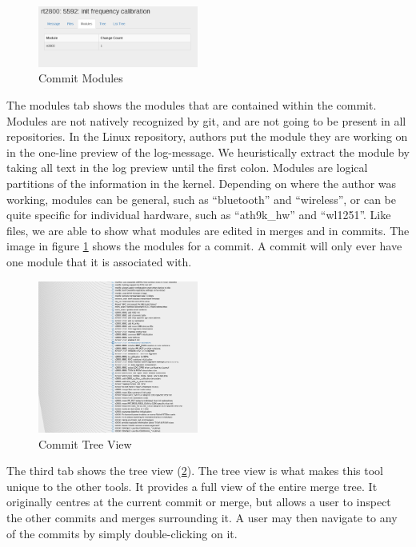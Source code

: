 \documentclass[conference, draftclsnofoot]{IEEEtran}
\begin{document}
\begin{figure}[h]
	\centering
	\includegraphics[width=0.47\textwidth]{figures/modules.png}
	\caption{Commit Modules}
	\label{fig:modules}
\end{figure}

The modules tab shows the modules that are contained within the commit. Modules
are not natively recognized by git, and are not going to be present in all
repositories. In the Linux repository, authors put the module they are working
on in the one-line preview of the log-message. We heuristically extract the
module by taking all text in the log preview until the first colon. Modules are
logical partitions of the information in the kernel. Depending on where the
author was working, modules can be general, such as ``bluetooth'' and
``wireless'', or can be quite specific for individual hardware, such as
``ath9k\_hw'' and ``wl1251''. Like files, we are able to show what modules are
edited in merges and in commits. The image in figure \ref{fig:modules} shows
the modules for a commit. A commit will only ever have one module that it is
associated with.

\begin{figure}[h]
	\centering
	\includegraphics[width=0.47\textwidth]{figures/tree_view.png}
	\caption{Commit Tree View}
	\label{fig:tree}
\end{figure}

The third tab shows the tree view (\ref{fig:tree}). The tree view is what makes
this tool unique to the other tools. It provides a full view of the entire
merge tree. It originally centres at the current commit or merge, but allows a
user to inspect the other commits and merges surrounding it. A user may then
navigate to any of the commits by simply double-clicking on it.
\end{document}
